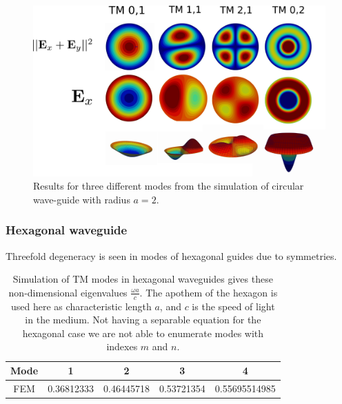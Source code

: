 \begin{figure}
\centering
\includegraphics[scale=0.1]{./img/circular_waveguide.pdf}
\caption{Results for three different modes from the simulation of circular wave-guide with radius $a=2$.}
\label{fig:circular_waveguide}
\end{figure}

\subsubsection{Hexagonal waveguide}

Threefold degeneracy is seen in modes of hexagonal guides due to symmetries.
\begin{table}
\begin{center}
\begin{tabular}{|c|c|c|c|c|}
\hline 
Mode & 1 & 2 & 3 & 4 \\ 
\hline 
FEM 	 & 0.36812333 & 0.46445718 &  0.53721354 & 0.55695514985 \\
\hline 
\end{tabular} 
\caption{Simulation of TM modes in hexagonal waveguides gives these non-dimensional eigenvalues $\frac{\omega a}{c}$. The apothem of the hexagon is used here as characteristic length $a$, and $c$ is the speed of light in the medium. Not having a separable equation for the hexagonal case we are not able to enumerate modes with indexes $m$ and $n$.}
\label{tab:hex_wav_comparison}
\end{center}
\end{table}

